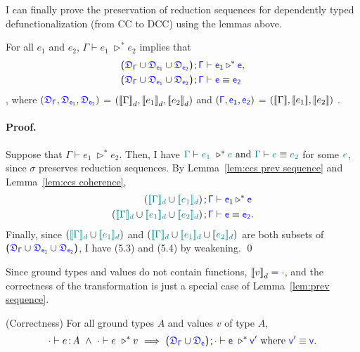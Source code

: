 I can finally prove the preservation of reduction sequences for dependently typed defunctionalization (from CC to DCC) using the lemmas above. 

\begin{lemma}For all $e_1$ and $e_2$, $\Gamma \vdash e_1\ \triangleright^* e_2$ implies that
\begin{align}
\sfpl \target{\fdef_{\Gamma}} \cup \target{\fdef_{e_1}} \cup \target{\fdef_{e_2}} \sfpr \semicolon \target{\Gamma} &\vdash
\target{e_1} \triangleright^* \target{e},\\
\sfpl \target{\fdef_{\Gamma}} \cup \target{\fdef_{e_1}} \cup \target{\fdef_{e_2}} \sfpr \semicolon \target{\Gamma} &\vdash\target{e} \equiv \target{e_2}
\end{align}
, where
$(\target{\fdef_{\Gamma}}, \target{\fdef_{e_1}}, \target{\fdef_{e_2}})$ = 
$({[\![ \Gamma ]\!]}_d, {[\![ e_1 ]\!]}_d, {[\![ e_2 ]\!]}_d)$ and 
$(\target{\Gamma}, \target{e_1}, \target{e_2})$ = 
$({[\![ \Gamma ]\!]}, {[\![ e_1 ]\!]}, {[\![ e_2 ]\!]})$
.
\paragraph{Proof.} Suppose that $\Gamma \vdash e_1\ \triangleright^* e_2$. Then, I have 
$\color{teal}{\Gamma}\color{black} \vdash \color{teal}{e_1}\color{black}\ \triangleright^* \color{teal}{e}\color{black} \text{ and } \color{teal}{\Gamma}\color{black} \vdash \color{teal}{e}\color{black} \equiv \color{teal}{e_2}\color{black}$ for some $\color{teal}{e}\color{black}$, since $\sigma$ preserves reduction sequences. By Lemma~\ref{lem:ccs prev sequence} and Lemma~\ref{lem:ccs coherence}, 
\begin{align*}
(\hbracketd{\helper{\Gamma}} \cup \hbracketd{\helper{e_1}}) \semicolon \target{\Gamma} &\vdash
\target{e_1} \triangleright^* \target{e}\\
(\hbracketd{\helper{\Gamma}} \cup \hbracketd{\helper{e_1}} \cup \hbracketd{\helper{e_2}}) \semicolon \target{\Gamma} &\vdash \target{e} \equiv \target{e_2}.
\end{align*}
Finally, since $(\color{teal}{[\![}\color{black}{\color{teal}{\Gamma}\color{black}}\color{teal}{]\!]_d}\color{black} \cup \color{teal}{[\![}\color{black}{\color{teal}{e_1}\color{black}}\color{teal}{]\!]_d}\color{black})$ and $(\color{teal}{[\![}\color{black}{\color{teal}{\Gamma}\color{black}}\color{teal}{]\!]_d}\color{black} \cup \color{teal}{[\![}\color{black}{\color{teal}{e_1}\color{black}}\color{teal}{]\!]_d}\color{black} \cup \color{teal}{[\![}\color{black}{\color{teal}{e_2}\color{black}}\color{teal}{]\!]_d}\color{black})$ are both subsets of $\sfpl \target{\fdef_{\Gamma}} \cup \target{\fdef_{e_1}} \cup \target{\fdef_{e_2}} \sfpr$, I have (5.3) and (5.4) by weakening. \qed
\label{lem:prev sequence}
\end{lemma}

Since ground types and values do not contain functions, $\bbracket{v}_d = \target{\cdot}$, and the correctness of the transformation is just a special case of Lemma~\ref{lem:prev sequence}.

\begin{coro}(Correctness) For all ground types $A$ and values $v$ of type $A$,
\begin{equation*}
	\cdot \vdash e \goodcolon A \ \land \
	\cdot \vdash e\ \triangleright^* v\ \Longrightarrow\ 
	\sfpl \target{\fdef_{\Gamma}} \cup \target{\fdef_{e}} \sfpr \semicolon \target{\cdot} \vdash \target{e}\ \triangleright^* \target{v'} \text{ where } \target{v'} \equiv \target{v}.
\end{equation*}
\end{coro}


